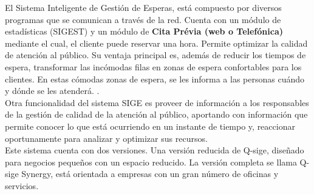 El Sistema Inteligente de Gestión de Esperas, está compuesto por diversos programas que se comunican a través de la red. Cuenta con un módulo de estadísticas (SIGEST) y un módulo de \textbf{Cita Prévia (web o Telefónica)} mediante el cual, el cliente puede reservar una hora. Permite optimizar la calidad de atención al público. Su ventaja principal es, además de reducir los tiempos de espera, transformar las incómodas filas en zonas de espera confortables para los clientes. En estas cómodas zonas de espera, se les informa a las personas cuándo y dónde se les atenderá. \cite{Idm14}.\\

Otra funcionalidad del sistema SIGE es proveer de información a los responsables de la gestión de calidad de la atención al público, aportando con información que permite conocer lo que está ocurriendo en un instante de tiempo y, reaccionar oportunamente para analizar y optimizar sus recursos.\\ 

Este sistema cuenta con dos versiones. Una versión reducida de Q-sige, diseñado para negocios pequeños con un espacio reducido. La versión completa se llama Q-sige Synergy, está orientada a empresas con un gran número de oficinas y servicios.\\




